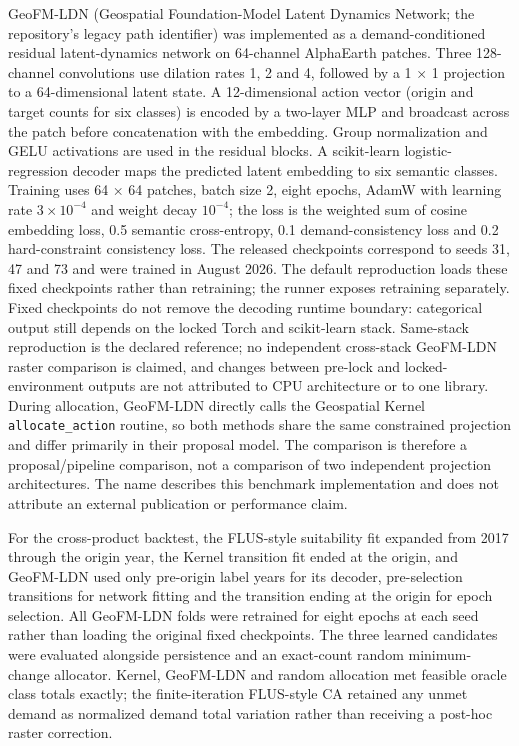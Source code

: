 GeoFM-LDN (Geospatial Foundation-Model Latent Dynamics Network; the
repository's legacy path identifier) was implemented as a
demand-conditioned residual latent-dynamics network on 64-channel
AlphaEarth patches. Three 128-channel convolutions use dilation rates 1,
2 and 4, followed by a 1 × 1 projection to a 64-dimensional latent
state. A 12-dimensional action vector (origin and target counts for six
classes) is encoded by a two-layer MLP and broadcast across the patch
before concatenation with the embedding. Group normalization and GELU
activations are used in the residual blocks. A scikit-learn
logistic-regression decoder maps the predicted latent embedding to six
semantic classes. Training uses 64 × 64 patches, batch size 2, eight
epochs, AdamW with learning rate \(3\times10^{-4}\) and weight decay
\(10^{-4}\); the loss is the weighted sum of cosine embedding loss, 0.5
semantic cross-entropy, 0.1 demand-consistency loss and 0.2
hard-constraint consistency loss. The released checkpoints correspond to
seeds 31, 47 and 73 and were trained in August 2026. The default
reproduction loads these fixed checkpoints rather than retraining; the
runner exposes retraining separately. Fixed checkpoints do not remove
the decoding runtime boundary: categorical output still depends on the
locked Torch and scikit-learn stack. Same-stack reproduction is the
declared reference; no independent cross-stack GeoFM-LDN raster
comparison is claimed, and changes between pre-lock and
locked-environment outputs are not attributed to CPU architecture or to
one library. During allocation, GeoFM-LDN directly calls the Geospatial
Kernel \texttt{allocate\_action} routine, so both methods share the same
constrained projection and differ primarily in their proposal model. The
comparison is therefore a proposal/pipeline comparison, not a comparison
of two independent projection architectures. The name describes this
benchmark implementation and does not attribute an external publication
or performance claim.

For the cross-product backtest, the FLUS-style suitability fit expanded
from 2017 through the origin year, the Kernel transition fit ended at
the origin, and GeoFM-LDN used only pre-origin label years for its
decoder, pre-selection transitions for network fitting and the
transition ending at the origin for epoch selection. All GeoFM-LDN folds
were retrained for eight epochs at each seed rather than loading the
original fixed checkpoints. The three learned candidates were evaluated
alongside persistence and an exact-count random minimum-change
allocator. Kernel, GeoFM-LDN and random allocation met feasible oracle
class totals exactly; the finite-iteration FLUS-style CA retained any
unmet demand as normalized demand total variation rather than receiving
a post-hoc raster correction.

